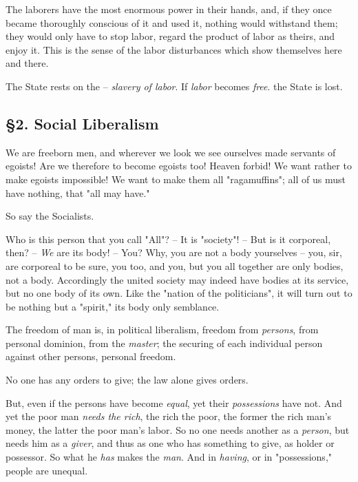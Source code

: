 The laborers have the most enormous power in their hands, and, if they once 
became thoroughly conscious of it and used it, nothing would withstand them; 
they would only have to stop labor, regard the product of labor as theirs, and 
enjoy it. This is the sense of the labor disturbances which show themselves 
here and there.

The State rests on the -- \textit{slavery of labor}. If \textit{labor} becomes 
\textit{free}. the State is lost.

\subsection[\S{}2. Social Liberalism]{\centering \S{}2. Social Liberalism}

We are freeborn men, and wherever we look we see ourselves made servants of 
egoists! Are we therefore to become egoists too! Heaven forbid! We want rather 
to make egoists impossible! We want to make them all "{}ragamuffins"{}; all of 
us must have nothing, that "{}all may have."{}

So say the Socialists.

Who is this person that you call "{}All"{}? -- It is "{}society"{}! -- But is 
it corporeal, then? -- \textit{We} are its body! -- You? Why, you are not a 
body yourselves -- you, sir, are corporeal to be sure, you too, and you, but 
you all together are only bodies, not a body. Accordingly the united society 
may indeed have bodies at its service, but no one body of its own. Like the 
"{}nation of the politicians"{}, it will turn out to be nothing but a 
"{}spirit,"{} its body only semblance.

The freedom of man is, in political liberalism, freedom from \textit{persons}, 
from personal dominion, from the \textit{master}; the securing of each 
individual person against other persons, personal freedom.

No one has any orders to give; the law alone gives orders.

But, even if the persons have become \textit{equal}, yet their 
\textit{possessions} have not. And yet the poor man \textit{needs the rich}, 
the rich the poor, the former the rich man's money, the latter the poor man's 
labor. So no one needs another as a \textit{person}, but needs him as a 
\textit{giver}, and thus as one who has something to give, as holder or 
possessor. So what he \textit{has} makes the \textit{man}. And in 
\textit{having}, or in "{}possessions,"{} people are unequal.

